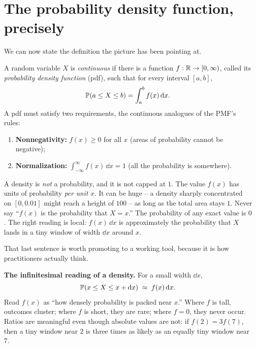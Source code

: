 \section{The probability density function, precisely}
\label{ch10:pdf-def}

We can now state the definition the picture has been pointing at.

\begin{definition}
\label{ch10:def-pdf}
A random variable $X$ is \emph{continuous} if there is a function
$f:\mathbb{R} \to [0,\infty)$, called its \emph{probability density function} (pdf), such
that for every interval $[a,b]$,
\[
  \operatorname{\mathbb{P}}(a \le X \le b) = \int_a^b f(x)\,\mathrm{d} x .
\]
A pdf must satisfy two requirements, the continuous analogues of the PMF's rules:
\begin{enumerate}
\item \textbf{Nonnegativity:} $f(x) \ge 0$ for all $x$ (areas of probability cannot
      be negative);
\item \textbf{Normalization:} $\displaystyle \int_{-\infty}^{\infty} f(x)\,\dd x = 1$
      (all the probability is somewhere).
\end{enumerate}
\end{definition}

\begin{trapbox}
A density is \emph{not} a probability, and it is not capped at $1$. The value
$f(x)$ has units of probability \emph{per unit $x$}. It can be huge -- a density
sharply concentrated on $[0,0.01]$ might reach a height of $100$ -- as long as the
total area stays $1$. Never say ``$f(x)$ is the probability that $X=x$.'' The
probability of any exact value is $0$. The right reading is local: $f(x)\,\dd x$ is
approximately the probability that $X$ lands in a tiny window of width $\dd x$
around $x$.
\end{trapbox}

That last sentence is worth promoting to a working tool, because it is how
practitioners actually think.

\begin{focusbox}
\textbf{The infinitesimal reading of a density.} For a small width $\dd x$,
\[
  \operatorname{\mathbb{P}}\!\left(x \le X \le x + \mathrm{d} x\right) \;\approx\; f(x)\,\mathrm{d} x .
\]
Read $f(x)$ as ``how densely probability is packed near $x$.'' Where $f$ is tall,
outcomes cluster; where $f$ is short, they are rare; where $f=0$, they never occur.
Ratios are meaningful even though absolute values are not: if $f(2) = 3 f(7)$, then
a tiny window near $2$ is three times as likely as an equally tiny window near $7$.
\end{focusbox}

